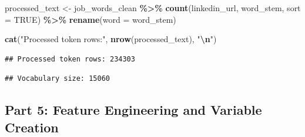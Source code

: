 \documentclass[
]{article}
\newenvironment{Shaded}{\begin{snugshade}}{\end{snugshade}}
\newcommand{\AttributeTok}[1]{\textcolor[rgb]{0.13,0.29,0.53}{#1}}
\newcommand{\ConstantTok}[1]{\textcolor[rgb]{0.56,0.35,0.01}{#1}}
\newcommand{\FunctionTok}[1]{\textcolor[rgb]{0.13,0.29,0.53}{\textbf{#1}}}
\newcommand{\NormalTok}[1]{#1}
\newcommand{\OtherTok}[1]{\textcolor[rgb]{0.56,0.35,0.01}{#1}}
\newcommand{\SpecialCharTok}[1]{\textcolor[rgb]{0.81,0.36,0.00}{\textbf{#1}}}
\newcommand{\StringTok}[1]{\textcolor[rgb]{0.31,0.60,0.02}{#1}}
\begin{document}
\begin{Shaded}
\begin{Highlighting}[]
\NormalTok{processed\_text }\OtherTok{\textless{}{-}}\NormalTok{ job\_words\_clean }\SpecialCharTok{\%\textgreater{}\%}
  \FunctionTok{count}\NormalTok{(linkedin\_url, word\_stem, }\AttributeTok{sort =} \ConstantTok{TRUE}\NormalTok{) }\SpecialCharTok{\%\textgreater{}\%}
  \FunctionTok{rename}\NormalTok{(}\AttributeTok{word =}\NormalTok{ word\_stem)}

\FunctionTok{cat}\NormalTok{(}\StringTok{"Processed token rows:"}\NormalTok{, }\FunctionTok{nrow}\NormalTok{(processed\_text), }\StringTok{"}\SpecialCharTok{\textbackslash{}n}\StringTok{"}\NormalTok{)}
\end{Highlighting}
\end{Shaded}

\begin{verbatim}
## Processed token rows: 234303
\end{verbatim}

\begin{Shaded}
\end{Shaded}

\begin{verbatim}
## Vocabulary size: 15060
\end{verbatim}

\subsection{Part 5: Feature Engineering and Variable
Creation}\label{part-5-feature-engineering-and-variable-creation}
\end{document}

